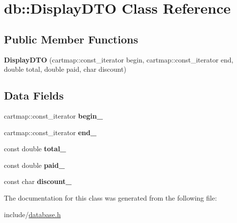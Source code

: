 \hypertarget{classdb_1_1DisplayDTO}{}\section{db\+:\+:Display\+D\+TO Class Reference}
\label{classdb_1_1DisplayDTO}
\subsection*{Public Member Functions}
\begin{DoxyCompactItemize}
\item 
\mbox{\label{classdb_1_1DisplayDTO_aa4adb40cc2ccdbe3ac9cb59adc61fa28}} 
{\bfseries Display\+D\+TO} (cartmap\+::const\+\_\+iterator begin, cartmap\+::const\+\_\+iterator end, double total, double paid, char discount)
\end{DoxyCompactItemize}
\subsection*{Data Fields}
\begin{DoxyCompactItemize}
\item 
\mbox{\label{classdb_1_1DisplayDTO_a748cef13c756e7cfe9ef76d0cb28d3be}} 
cartmap\+::const\+\_\+iterator {\bfseries begin\+\_\+}
\item 
\mbox{\label{classdb_1_1DisplayDTO_a1e6139706e3fa9426504801d6bd7a09c}} 
cartmap\+::const\+\_\+iterator {\bfseries end\+\_\+}
\item 
\mbox{\label{classdb_1_1DisplayDTO_a37541ef70128d97861a8d23594cd3c0b}} 
const double {\bfseries total\+\_\+}
\item 
\mbox{\label{classdb_1_1DisplayDTO_a0f0098e6da9400b5aaef0a01c3afe3bf}} 
const double {\bfseries paid\+\_\+}
\item 
\mbox{\label{classdb_1_1DisplayDTO_aa8e278c1eb2f3445f343d5a19ba23cdc}} 
const char {\bfseries discount\+\_\+}
\end{DoxyCompactItemize}


The documentation for this class was generated from the following file\+:\begin{DoxyCompactItemize}
\item 
include/\mbox{\hyperlink{database_8h}{database.\+h}}\end{DoxyCompactItemize}
